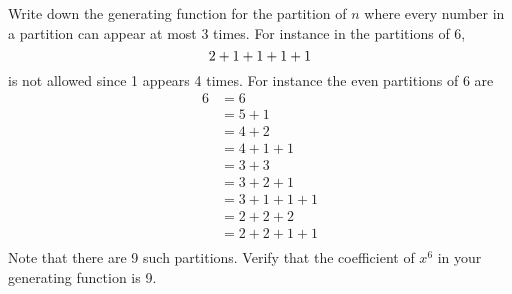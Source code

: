Write down the generating function for the partition of $n$ where
every number in a partition can appear at most 3 times.
For instance in the partitions of $6$,
\[
2 + 1 + 1 + 1 + 1 \\
\]
is not allowed since 1 appears 4 times.
For instance the even partitions of 6 are
\begin{align*}
6
&= 6 \\
&= 5 + 1\\
&= 4 + 2 \\
&= 4 + 1 + 1 \\
&= 3 + 3 \\
&= 3 + 2 + 1 \\
&= 3 + 1 + 1 + 1 \\
&= 2 + 2 + 2 \\
&= 2 + 2 + 1 + 1 \\
\end{align*}
Note that there are 9 such partitions.
Verify that the coefficient of $x^6$ in your generating function is 9.
